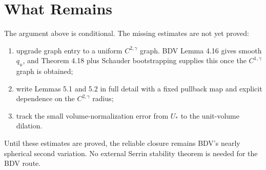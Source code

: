 \documentclass[11pt]{article}
\begin{document}
\section{What Remains}

The argument above is conditional. The missing estimates are not yet proved:
\begin{enumerate}
\item upgrade graph entry to a uniform \(C^{2,\gamma}\) graph. BDV Lemma 4.16
gives smooth \(q_u\), and Theorem 4.18 plus Schauder bootstrapping supplies
this once the \(C^{1,\gamma}\) graph is obtained;
\item write Lemmas 5.1 and 5.2 in full detail with a fixed pullback map and
explicit dependence on the \(C^{2,\gamma}\) radius;
\item track the small volume-normalization error from \(U_*\) to the
unit-volume dilation.
\end{enumerate}
Until these estimates are proved, the reliable closure remains BDV's nearly
spherical second variation. No external Serrin stability theorem is needed for
the BDV route.
\end{document}
